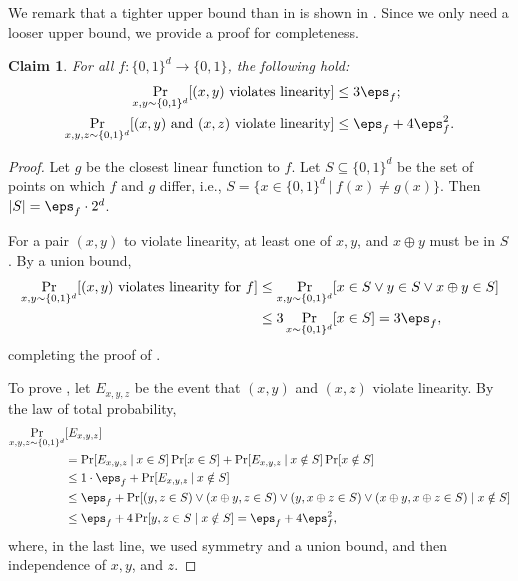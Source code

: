 \documentclass[11pt]{article}
\numberwithin{equation}{section}
\newtheorem{claim}[theorem]{Claim}
\theoremstyle{definition}
\theoremstyle{plain}
\begin{document}
 We remark that a tighter upper bound than  in  is shown in \cite[Lemma 3.2]{BellareCHKS96}. Since we only need a looser upper bound, we provide a proof for completeness. 

\begin{claim}\label{clm:witness_upper}
For all $f\colon \{0,1\}^d \to \{0,1\}$, the following hold:
\begin{align}
    \Pr_{x,y\sim \{0,1\}^d}[(x,y) \textnormal{ violates linearity}] &\leq 3\eps_f; \label{eq:witness_upper}\\
        \Pr_{x,y,z\sim \{0,1\}^d}[(x,y) \textnormal{ and } (x, z) \textnormal{ violate linearity}] &\leq \eps_f + 4\eps_f^2.\label{eq:double_witness_upper} 
\end{align}
\end{claim}
\begin{proof}
Let $g$ be the closest linear function to $f$. Let $S \subseteq \{0,1\}^d$ be the set of points on which $f$ and $g$ differ, i.e., $S = \{x \in \{0,1\}^d \: | \: f(x)\neq g(x)\}$. Then $|S| = \eps_f \cdot 2^d$.

For a pair $(x, y)$ to violate linearity, at least one of $x, y$, and  $x\oplus y$ must be in $S$. By a union bound,
\begin{align*}
  \Pr_{x,y \sim\{0,1\}^d}[(x,y)
  \textnormal{ violates linearity for $f$}] 
 &\leq \Pr_{x,y\sim \{0,1\}^d}[x \in S \vee y \in S \vee x\oplus y \in S]\\ 
     &\leq 3\Pr_{x\sim\{0,1\}^d}[x \in S] = 3\eps_f,
\end{align*}
completing the proof of . 

To prove , let $E_{x,y,z}$ be the event that $(x,y)$ and $(x,z)$ violate linearity. By the law of total probability,
\begin{align*}   %
      \Pr_{x,y,z\sim \{0,1\}^d}&[E_{x,y,z}] \\
      &=      \Pr[E_{x,y,z} \: | \: x\in S]\Pr[x \in S]+ \Pr[E_{x,y,z} \: | \: x\notin S]\Pr[x \notin S] \nonumber \\
      &\leq 1\cdot \eps_f  + \Pr[E_{x,y,z} \: | \: x\notin S] \\ 
      &\leq \eps_f + \Pr[(y,z \in S) \vee (x \oplus y, z \in S) \vee (y, x \oplus z \in S) \vee (x \oplus y, x \oplus z \in S)\mid x \notin S]\\
      &\leq \eps_f + 4\Pr[y,z \in S\mid x \notin S] 
      = \eps_f + 4\eps_f^2,
\end{align*}
where, in the last line, we used symmetry and a union bound, and then independence of $x, y$, and $z$. 
\end{proof}
\end{document}
